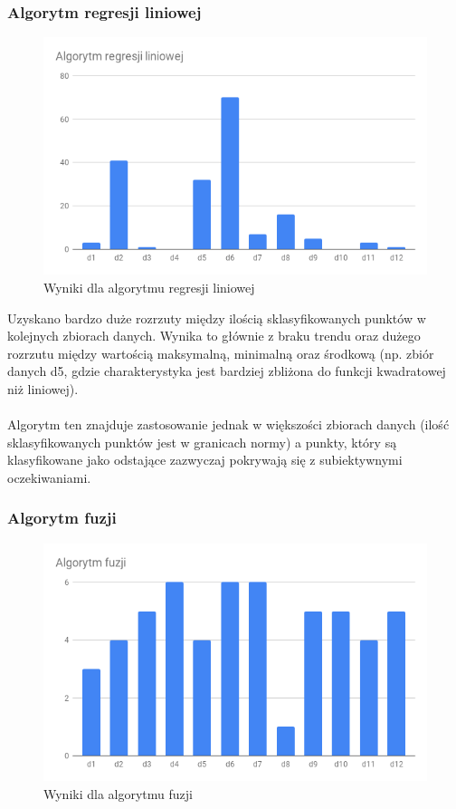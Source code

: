 \documentclass[eng,printmode]{mgr}
\begin{document}
\subsubsection{Algorytm regresji liniowej}
\begin{figure}[H]
  \begin{center}
  \includegraphics[scale=0.7]{r_reg}
  \end{center}
  \caption{Wyniki dla algorytmu regresji liniowej}
  \label{fig:r_reg}
\end{figure}

Uzyskano bardzo duże rozrzuty między ilością sklasyfikowanych punktów w kolejnych zbiorach danych. Wynika to głównie z braku trendu oraz dużego rozrzutu między wartością maksymalną, minimalną oraz środkową (np. zbiór danych d5, gdzie charakterystyka jest bardziej zbliżona do funkcji kwadratowej niż liniowej).
\\\\
Algorytm ten znajduje zastosowanie jednak w większości zbiorach danych (ilość sklasyfikowanych punktów jest w granicach normy) a punkty, który są klasyfikowane jako odstające zazwyczaj pokrywają się z subiektywnymi oczekiwaniami.
\subsubsection{Algorytm fuzji}
\begin{figure}[H]
  \begin{center}
  \includegraphics[scale=0.7]{r_fusion}
  \end{center}
  \caption{Wyniki dla algorytmu fuzji}
  \label{fig:r_fusion}
\end{figure}
\end{document}
